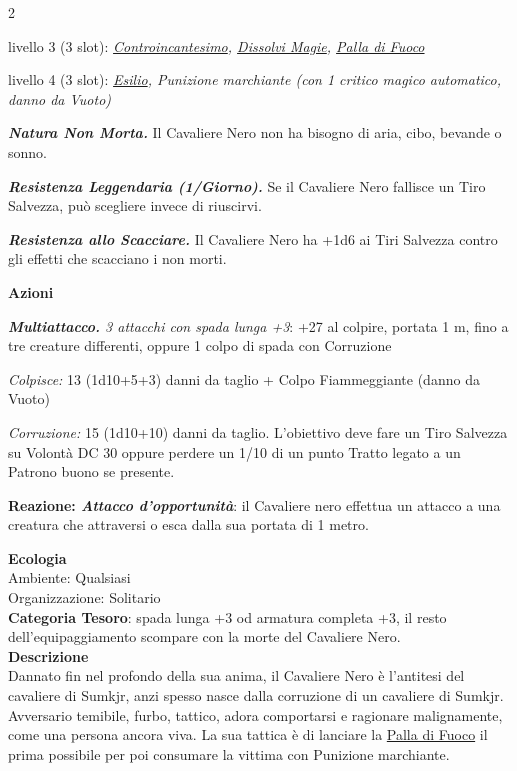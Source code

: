 \begin{multicols}{2}
{livello 3 (3 slot): \emph{\hyperlink{Controincantesimo}{Controincantesimo}, \hyperlink{Dissolvi Magie}{Dissolvi Magie}, \hyperlink{Palla di Fuoco}{Palla di Fuoco}}

livello 4 (3 slot): \emph{\hyperlink{Esilio}{Esilio}, Punizione marchiante (con 1 critico magico automatico, danno da Vuoto)}

\emph{\textbf{Natura Non Morta.}} Il Cavaliere Nero non ha bisogno di aria, cibo, bevande o sonno.

\emph{\textbf{Resistenza Leggendaria (1/Giorno).}} Se il Cavaliere Nero fallisce un Tiro Salvezza, può scegliere invece di riuscirvi.

\emph{\textbf{Resistenza allo Scacciare.}} Il Cavaliere Nero ha +1d6 ai Tiri Salvezza contro gli effetti che scacciano i non morti.

\textbf{Azioni}

\emph{\textbf{Multiattacco.} 3 attacchi con spada lunga +3}: +27 al colpire, portata 1 m, fino a tre creature differenti, oppure 1 colpo di spada con Corruzione

\emph{Colpisce:} 13 (1d10+5+3) danni da taglio + Colpo Fiammeggiante (danno da Vuoto)

\emph{Corruzione:} 15 (1d10+10) danni da taglio. L'obiettivo deve fare un Tiro Salvezza su Volontà DC 30 oppure perdere un 1/10 di un punto Tratto legato a un Patrono buono se presente.

\textbf{Reazione: \emph{Attacco d'opportunità}}: il Cavaliere nero effettua un attacco a una creatura che attraversi o esca dalla sua portata di 1 metro.

\textbf{Ecologia}\\
Ambiente: Qualsiasi\\
Organizzazione: Solitario\\
\textbf{Categoria Tesoro}: spada lunga +3 od armatura completa +3, il resto dell'equipaggiamento scompare con la morte del Cavaliere Nero.\\
\textbf{Descrizione}\\
Dannato fin nel profondo della sua anima, il Cavaliere Nero è l'antitesi del cavaliere di Sumkjr, anzi spesso nasce dalla corruzione di un cavaliere di Sumkjr. Avversario temibile, furbo, tattico, adora comportarsi e ragionare malignamente, come una persona ancora viva. La sua tattica è di lanciare la \hyperlink{Palla di Fuoco}{Palla di Fuoco} il prima possibile per poi consumare la vittima con Punizione marchiante.

}
\end{multicols}
